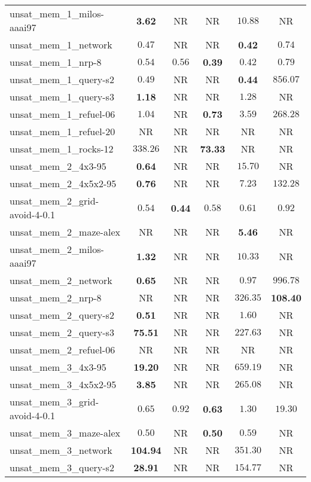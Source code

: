 \begin{tabular}{lccccc}
unsat\_mem\_1\_milos-aaai97 & \textbf{3.62} & NR & NR & $10.88$ & NR \\
unsat\_mem\_1\_network & $0.47$ & NR & NR & \textbf{0.42} & $0.74$ \\
unsat\_mem\_1\_nrp-8 & $0.54$ & $0.56$ & \textbf{0.39} & $0.42$ & $0.79$ \\
unsat\_mem\_1\_query-s2 & $0.49$ & NR & NR & \textbf{0.44} & $856.07$ \\
unsat\_mem\_1\_query-s3 & \textbf{1.18} & NR & NR & $1.28$ & NR \\
unsat\_mem\_1\_refuel-06 & $1.04$ & NR & \textbf{0.73} & $3.59$ & $268.28$ \\
unsat\_mem\_1\_refuel-20 & NR & NR & NR & NR & NR \\
unsat\_mem\_1\_rocks-12 & $338.26$ & NR & \textbf{73.33} & NR & NR \\
unsat\_mem\_2\_4x3-95 & \textbf{0.64} & NR & NR & $15.70$ & NR \\
unsat\_mem\_2\_4x5x2-95 & \textbf{0.76} & NR & NR & $7.23$ & $132.28$ \\
unsat\_mem\_2\_grid-avoid-4-0.1 & $0.54$ & \textbf{0.44} & $0.58$ & $0.61$ & $0.92$ \\
unsat\_mem\_2\_maze-alex & NR & NR & NR & \textbf{5.46} & NR \\
unsat\_mem\_2\_milos-aaai97 & \textbf{1.32} & NR & NR & $10.33$ & NR \\
unsat\_mem\_2\_network & \textbf{0.65} & NR & NR & $0.97$ & $996.78$ \\
unsat\_mem\_2\_nrp-8 & NR & NR & NR & $326.35$ & \textbf{108.40} \\
unsat\_mem\_2\_query-s2 & \textbf{0.51} & NR & NR & $1.60$ & NR \\
unsat\_mem\_2\_query-s3 & \textbf{75.51} & NR & NR & $227.63$ & NR \\
unsat\_mem\_2\_refuel-06 & NR & NR & NR & NR & NR \\
unsat\_mem\_3\_4x3-95 & \textbf{19.20} & NR & NR & $659.19$ & NR \\
unsat\_mem\_3\_4x5x2-95 & \textbf{3.85} & NR & NR & $265.08$ & NR \\
unsat\_mem\_3\_grid-avoid-4-0.1 & $0.65$ & $0.92$ & \textbf{0.63} & $1.30$ & $19.30$ \\
unsat\_mem\_3\_maze-alex & $0.50$ & NR & \textbf{0.50} & $0.59$ & NR \\
unsat\_mem\_3\_network & \textbf{104.94} & NR & NR & $351.30$ & NR \\
unsat\_mem\_3\_query-s2 & \textbf{28.91} & NR & NR & $154.77$ & NR \\

\end{tabular}
